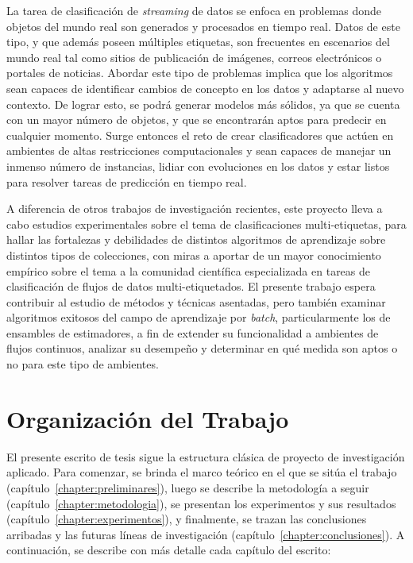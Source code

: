 La tarea de clasificación de \textit{streaming} de datos se enfoca en problemas
donde objetos del mundo real son generados y procesados en tiempo real. Datos de
este tipo, y que además poseen múltiples etiquetas, son frecuentes en escenarios
del mundo real tal como sitios de publicación de imágenes, correos electrónicos
o portales de noticias. Abordar este tipo de problemas implica que los
algoritmos sean capaces de identificar cambios de concepto en los datos y
adaptarse al nuevo contexto. De lograr esto, se podrá generar modelos más
sólidos, ya que se cuenta con un mayor número de objetos, y que se encontrarán
aptos para predecir en cualquier momento. Surge entonces el reto de crear
clasificadores que actúen en ambientes de altas restricciones computacionales y
sean capaces de manejar un inmenso número de instancias, lidiar con evoluciones
en los datos y estar listos para resolver tareas de predicción en tiempo real.

A diferencia de otros trabajos de investigación recientes, este proyecto lleva a
cabo estudios experimentales sobre el tema de clasificaciones multi-etiquetas,
para hallar las fortalezas y debilidades de distintos algoritmos de aprendizaje
sobre distintos tipos de colecciones, con miras a aportar de un mayor
conocimiento empírico sobre el tema a la comunidad científica especializada en
tareas de clasificación de flujos de datos multi-etiquetados. El presente
trabajo espera contribuir al estudio de métodos y técnicas asentadas, pero
también examinar algoritmos exitosos del campo de aprendizaje por
\textit{batch}, particularmente los de ensambles de estimadores, a fin de
extender su funcionalidad a ambientes de flujos continuos, analizar su desempeño
y determinar en qué medida son aptos o no para este tipo de ambientes.


\section{Organización del Trabajo}

El presente escrito de tesis sigue la estructura clásica de proyecto de
investigación aplicado. Para comenzar, se brinda el marco teórico en el que se
sitúa el trabajo (capítulo~\ref{chapter:preliminares}), luego se describe la
metodología a seguir (capítulo~\ref{chapter:metodologia}), se presentan los
experimentos y sus resultados (capítulo~\ref{chapter:experimentos}), y
finalmente, se trazan las conclusiones arribadas y las futuras líneas de
investigación (capítulo~\ref{chapter:conclusiones}). A continuación, se describe
con más detalle cada capítulo del escrito:

